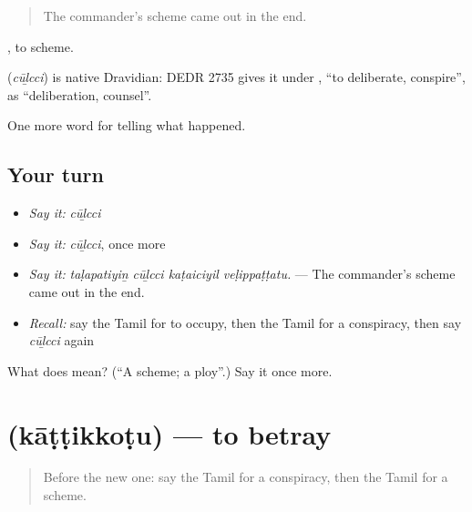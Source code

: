 \begin{quote}
The commander's scheme came out in the end.
\end{quote}

 , to scheme.

\begin{cousinweb}
\textbf{} (\emph{cūḻcci}) is native Dravidian: DEDR 2735 gives it under , \textquotedblleft{}to deliberate, conspire\textquotedblright{}, as \textquotedblleft{}deliberation, counsel\textquotedblright{}.
\end{cousinweb}

\begin{grammarlens}[title={What you've built}]
One more word for telling what happened.
\end{grammarlens}

\subsection*{Your turn}
\begin{itemize}
\raggedright
  \item \emph{Say it:} \emph{cūḻcci}
  \item \emph{Say it:} \emph{cūḻcci}, once more
  \item \emph{Say it:} \emph{taḷapatiyiṉ cūḻcci kaṭaiciyil veḷippaṭṭatu.} — The commander's scheme came out in the end.
  \item \emph{Recall:} say the Tamil for to occupy, then the Tamil for a conspiracy, then say \emph{cūḻcci} again
\end{itemize}

\begin{tcolorbox}[breakable,colback=teal!4,colframe=teal!35!black,title={Before you move on}]
What does  mean? (\textquotedblleft{}A scheme; a ploy\textquotedblright{}.) Say it once more.
\end{tcolorbox}
\section[\texorpdfstring{\ta{காட்டிக்கொடு} (kāṭṭikkoṭu)}{காட்டிக்கொடு (kāṭṭikkoṭu)}]{ (kāṭṭikkoṭu) — to betray}

\label{lesson:TA-C337-kattikkotu}



\begin{quote}
Before the new one: say the Tamil for a conspiracy, then the Tamil for a scheme.
\end{quote}

